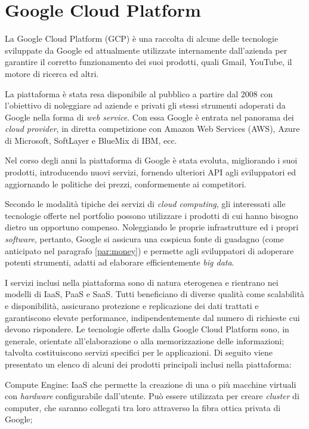 \section{Google Cloud Platform}
\label{chap:gcp}

La Google Cloud Platform (GCP) è una raccolta di alcune delle tecnologie sviluppate da Google ed attualmente utilizzate internamente dall’azienda per garantire il corretto 
funzionamento dei suoi prodotti, quali Gmail, YouTube, il motore di ricerca ed altri.

La piattaforma è stata resa disponibile al pubblico a partire dal 2008 con l’obiettivo di noleggiare ad aziende e privati gli stessi strumenti adoperati da Google nella forma 
di \textit{web service}. Con essa Google è entrata nel panorama dei \textit{cloud provider}, in diretta competizione con Amazon Web Services (AWS), Azure di Microsoft, SoftLayer e BlueMix di IBM, ecc.

Nel corso degli anni la piattaforma di Google è stata evoluta, migliorando i suoi prodotti, introducendo nuovi servizi, fornendo ulteriori API agli sviluppatori ed aggiornando 
le politiche dei prezzi, conformemente ai competitori.

Secondo le modalità tipiche dei servizi di \textit{cloud computing}, gli interessati alle tecnologie offerte nel portfolio possono utilizzare i prodotti di cui hanno bisogno dietro un 
opportuno compenso. Noleggiando le proprie infrastrutture ed i propri \textit{software}, pertanto, Google si assicura una cospicua fonte di guadagno (come anticipato nel paragrafo \ref{par:money}) 
e permette agli sviluppatori di adoperare potenti strumenti, adatti ad elaborare efficientemente \textit{big data}.

I servizi inclusi nella piattaforma sono di natura eterogenea e rientrano nei modelli di IaaS, PaaS e SaaS. Tutti beneficiano di diverse qualità come scalabilità e disponibilità, 
assicurano protezione e replicazione dei dati trattati e garantiscono elevate performance, indipendentemente dal numero di richieste cui devono rispondere. Le tecnologie offerte 
dalla Google Cloud Platform sono, in generale, orientate all’elaborazione o alla memorizzazione delle informazioni; talvolta costituiscono servizi specifici per le applicazioni. 
Di seguito viene presentato un elenco di alcuni dei prodotti principali inclusi nella piattaforma:

Compute Engine: IaaS che permette la creazione di una o più macchine virtuali con \textit{hardware} configurabile dall’utente. Può essere utilizzata per creare \textit{cluster} di computer, che 
saranno collegati tra loro attraverso la fibra ottica privata di Google;

